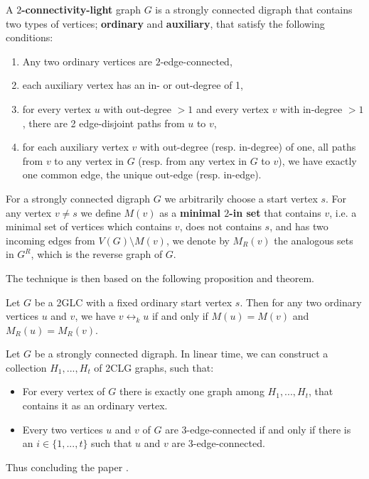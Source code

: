 \begin{definition}
    A \textbf{$2$-connectivity-light} graph $G$ is a strongly connected digraph that contains two types of vertices; \textbf{ordinary} and \textbf{auxiliary},
    that satisfy the following conditions:
    \begin{enumerate}
        \item Any two ordinary vertices are $2$-edge-connected,
        \item each auxiliary vertex has an in- or out-degree of 1,
        \item for every vertex $u$ with out-degree $>1$ and every vertex $v$ with in-degree $>1$, there are 2 edge-disjoint paths from $u$ to $v$,
        \item for each auxiliary vertex $v$ with out-degree (resp. in-degree) of one, all paths from $v$ to any vertex in $G$ (resp. from any vertex in $G$ to $v$),
        we have exactly one common edge, the unique out-edge (resp. in-edge).
    \end{enumerate}
\end{definition}

\begin{definition}
    For a strongly connected digraph $G$ we arbitrarily choose a start vertex $s$. For any vertex $v \neq s$ we define $M(v)$ as a \textbf{minimal $2$-in set} that contains $v$, i.e. a minimal set of vertices which contains $v$, does
    not contains $s$, and has two incoming edges from $V(G) \setminus M(v)$, we denote by $M_R(v)$ the analogous sets in $G^R$, which is the reverse graph of 
    $G$.
\end{definition}

The technique is then based on the following proposition and theorem.

\renewcommand{\theproposition}{I.3} 
\begin{proposition}
    Let $G$ be a 2GLC with a fixed ordinary start vertex $s$. Then for any two ordinary vertices $u$ and $v$, we have $v \leftrightarrow_k u$
    if and only if $M(u) = M(v)$ and $M_R(u) = M_R(v)$.
\end{proposition}
\renewcommand{\theproposition}{\arabic{proposition}}

\renewcommand{\thetheorem}{II.5} 
\begin{theorem}
    Let $G$ be a strongly connected digraph. In linear time, we can construct a collection $H_1, ..., H_t$ of 2CLG graphs, such that:
    \begin{itemize}
        \item For every vertex of $G$ there is exactly one graph among $H_1,..., H_t$, that contains it as an ordinary vertex.
        \item Every two vertices $u$ and $v$ of $G$ are $3$-edge-connected if and only if there is an $i \in \{1, ...,t\}$ such that $u$ and $v$
        are 3-edge-connected.
    \end{itemize}
\end{theorem}
\renewcommand{\thetheorem}{\arabic{theorem}}

\noindent
Thus concluding the paper \cite{10756155}.